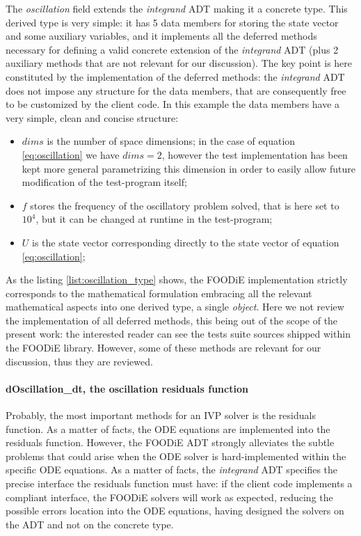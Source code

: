 The \emph{oscillation} field extends the \emph{integrand} ADT making it a concrete type. This derived type is very simple: it has 5 data members for storing the state vector and some auxiliary variables, and it implements all the deferred methods necessary for defining a valid concrete extension of the \emph{integrand} ADT (plus 2 auxiliary methods that are not relevant for our discussion). The key point is here constituted by the implementation of the deferred methods: the \emph{integrand} ADT does not impose any structure for the data members, that are consequently free to be customized by the client code. In this example the data members have a very simple, clean and concise structure:
\begin{itemize}
  \item $dims$ is the number of space dimensions; in the case of equation \ref{eq:oscillation} we have $dims=2$, however the test implementation has been kept more general parametrizing this dimension in order to easily allow future modification of the test-program itself;
  \item $f$ stores the frequency of the oscillatory problem solved, that is here set to $10^{4}$, but it can be changed at runtime in the test-program;
  \item $U$ is the state vector corresponding directly to the state vector of equation \ref{eq:oscillation};
  \end{itemize}

As the listing \ref{list:oscillation_type} shows, the FOODiE implementation strictly corresponds to the mathematical formulation embracing all the relevant mathematical aspects into one derived type, a single \emph{object}. Here we not review the implementation of all deferred methods, this being out of the scope of the present work: the interested reader can see the tests suite sources shipped within the FOODiE library. However, some of these methods are relevant for our discussion, thus they are reviewed.

\paragraph{dOscillation\_dt, the oscillation residuals function}

Probably, the most important methods for an IVP solver is the residuals function. As a matter of facts, the ODE equations are implemented into the residuals function. However, the FOODiE ADT strongly alleviates the subtle problems that could arise when the ODE solver is hard-implemented within the specific ODE equations. As a matter of facts, the \emph{integrand} ADT specifies the precise interface the residuals function must have: if the client code implements a compliant interface, the FOODiE solvers will work as expected, reducing the possible errors location into the ODE equations, having designed the solvers on the ADT and not on the concrete type.

